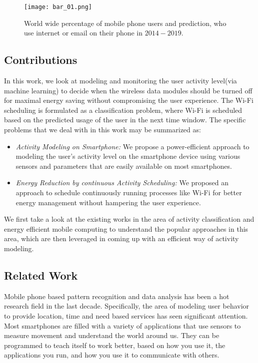 \begin{figure}[h]
\centering
\texttt{[image: bar\_01.png]}
\caption{World wide percentage of mobile phone users and prediction, who use internet or email on their phone in $2014-2019$\cite{survey}.}
\label{fig:bar}
\end{figure}

\subsection{Contributions}
In this work, we look at modeling and monitoring the user activity level(via machine learning) to decide when the wireless data 
modules should be turned off for maximal energy saving without compromising the user experience.
The Wi-Fi scheduling is formulated as a classification problem, where Wi-Fi is scheduled based on the predicted usage of the user in the next time window.
The specific problems that we deal with in this work may be summarized as:
\begin{itemize}
\item \emph{Activity Modeling on Smartphone:} We propose a power-efficient approach to modeling the
user's activity level on the smartphone device using various sensors and parameters that are easily available
on most smartphones. 
\item \emph{Energy Reduction by continuous Activity Scheduling:} We proposed an approach to schedule
continuously running processes like Wi-Fi for better energy management without hampering the user experience. 
\end{itemize}

We first take a look at the existing works in the area of activity classification and energy efficient mobile computing to understand
the popular approaches in this area, which are then leveraged in coming up with an efficient way of
activity modeling.

\subsection{Related Work}
Mobile phone based pattern recognition and data analysis has been a hot research field in the last decade. 
Specifically, the area of modeling user behavior to provide location, time and need based services has seen
significant attention. Most smartphones are filled with a variety of applications that use sensors to measure
movement and understand the world around us. They can be programmed to teach itself to work better, based
on how you use it, the applications you run, and how you use it to communicate with others.


